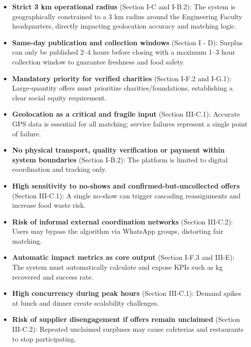 \documentclass[12pt]{article}
\begin{document}
\begin{itemize}
    \item \textbf{Strict 3 km operational radius} (Section I-C and I-B.2): The system is geographically constrained to a 3 km radius around the Engineering Faculty headquarters, directly impacting geolocation accuracy and matching logic.
   
    \item \textbf{Same-day publication and collection windows} (Section I - D): Surplus can only be published 2--4 hours before closing with a maximum 1--3 hour collection window to guarantee freshness and food safety.
   
    \item \textbf{Mandatory priority for verified charities} (Section I-F.2 and I-G.1): Large-quantity offers must prioritize charities/foundations, establishing a clear social equity requirement.
   
    \item \textbf{Geolocation as a critical and fragile input} (Section III-C.1): Accurate GPS data is essential for all matching; service failures represent a single point of failure.
   
    \item \textbf{No physical transport, quality verification or payment within system boundaries} (Section I-B.2): The platform is limited to digital coordination and tracking only.
   
    \item \textbf{High sensitivity to no-shows and confirmed-but-uncollected offers} (Section III-C.1): A single no-show can trigger cascading reassignments and increase food waste risk.
   
    \item \textbf{Risk of informal external coordination networks} (Section III-C.2): Users may bypass the algorithm via WhatsApp groups, distorting fair matching.
   
    \item \textbf{Automatic impact metrics as core output} (Section I-F.3 and III-E): The system must automatically calculate and expose KPIs such as kg recovered and success rate.
   
    \item \textbf{High concurrency during peak hours} (Section III-C.1): Demand spikes at lunch and dinner create scalability challenges.
   
    \item \textbf{Risk of supplier disengagement if offers remain unclaimed} (Section III-C.2): Repeated unclaimed surpluses may cause cafeterias and restaurants to stop participating.
   

\end{itemize}
\end{document}
